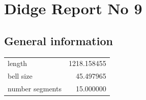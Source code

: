 \documentclass{article}
\begin{document}
\begin{centering}
\begin{figure}[!htb]
\end{figure}
\end{centering}
\section{Didge Report No 9}

\subsection{General information}
\begin{centering}

\begin{figure}[!htb]
\end{figure}
\begin{tabular}{lr}
\toprule
         length & 1218.158455 \\
      bell size &   45.497965 \\
number segments &   15.000000 \\
\bottomrule
\end{tabular}
\end{centering}
\end{document}

